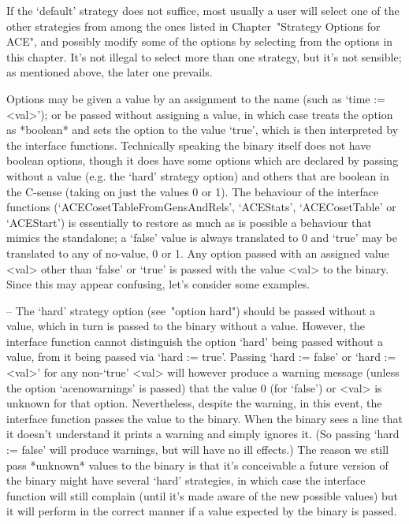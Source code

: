 If the `default' strategy does not suffice, most usually a  user  will
select one of the other strategies  from  among  the  ones  listed  in
Chapter~"Strategy Options for ACE", and possibly modify  some  of  the
options by selecting from  the  options  in  this  chapter.  It's  not
illegal to select more than one strategy, but it's  not  sensible;  as
mentioned above, the later one prevails.


Options may be given a value by an assignment to  the  name  (such  as
`time := <val>'); or be passed without assigning  a  value,  in  which
case {\GAP} treats the option as *boolean* and sets the option to  the
value `true', which  is  then  interpreted  by  the  {\ACE}  interface
functions. Technically speaking the {\ACE} binary itself does not have
boolean options, though it does have some options which  are  declared
by passing without a value  (e.g.  the  `hard'  strategy  option)  and
others that are boolean in the C-sense (taking on just the values 0 or
1).   The   behaviour    of    the    {\ACE}    interface    functions
(`ACECosetTableFromGensAndRels',   `ACEStats',   `ACECosetTable'    or
`ACEStart') is essentially  to  restore  as  much  as  is  possible  a
behaviour that mimics the {\ACE} standalone; a `false' value is always
translated to 0 and `true' may be translated to any of no-value, 0  or
1. Any option passed with an assigned value <val> other  than  `false'
or `true' is passed with the value <val> to the {\ACE}  binary.  Since
this may appear confusing, let's consider some examples.

\beginlist%

\item{--} The `hard' strategy option  (see~"option  hard")  should  be
passed without a value, which in turn is passed to the  {\ACE}  binary
without  a  value.  However,  the  {\ACE}  interface  function  cannot
distinguish the option `hard' being passed without a  value,  from  it
being passed via `hard := true'. Passing `hard := false' or  `hard  :=
<val>' for any non-`true' <val> will however produce a warning message
(unless the option `acenowarnings' is passed) that the  value  0  (for
`false') or <val> is unknown for that  option.  Nevertheless,  despite
the warning, in this event, the {\ACE} interface function  passes  the
value to the {\ACE} binary. When the {\ACE} binary sees a line that it
doesn't understand it prints a warning  and  simply  ignores  it.  (So
passing `hard := false' will produce warnings, but will  have  no  ill
effects.) The reason we still pass  *unknown*  values  to  the  {\ACE}
binary is that it's conceivable a future version of the {\ACE}  binary
might have  several  `hard'  strategies,  in  which  case  the  {\ACE}
interface function will still complain (until it's made aware  of  the
new possible values) but it will perform in the correct  manner  if  a
value expected by the {\ACE} binary is passed.

